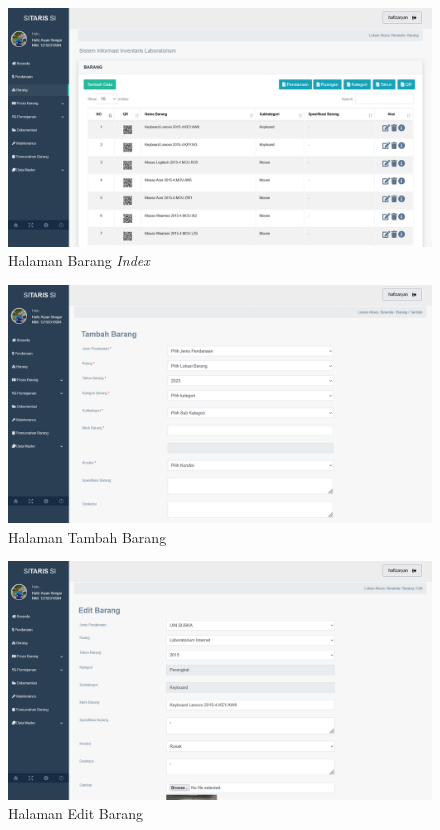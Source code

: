 \begin{enumerate}
        \begin{figure}
          \centering
          \includegraphics[width=0.82\linewidth]{konten//gambar/barang.png}
          \caption{Halaman Barang \textit{Index}}
          \label{fig:enter-label}
        \end{figure}

        \begin{figure}
          \centering
          \includegraphics[width=0.82\linewidth]{konten//gambar/barang tambah.png}
          \caption{Halaman Tambah Barang}
          \label{fig:enter-label}
        \end{figure}

        \begin{figure}
          \centering
          \includegraphics[width=0.82\linewidth]{konten//gambar/barang edit.png}
          \caption{Halaman Edit Barang}
          \label{fig:enter-label}
        \end{figure}


\end{enumerate}
